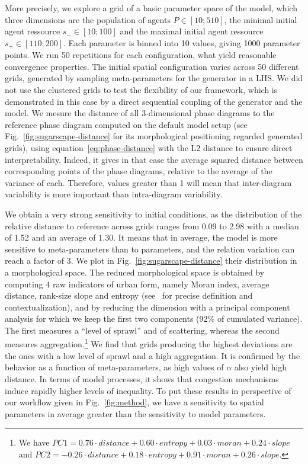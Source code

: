 \documentclass[Afour,sageh,times]{sagej}
\begin{document}
More precisely, we explore a grid of a basic parameter space of the model, which three dimensions are the population of agents $P\in \left[10;510\right]$, the minimal initial agent ressource $s_{-}\in \left[10;100\right]$ and the maximal initial agent ressource $s_{+}\in \left[110;200\right]$. Each parameter is binned into 10 values, giving 1000 parameter points. We run 50 repetitions for each configuration, what yield reasonable convergence properties. The initial spatial configuration varies across 50 different grids, generated by sampling meta-parameters for the generator in a LHS. We did not use the clustered grids to test the flexibility of our framework, which is demonstrated in this case by a direct sequential coupling of the generator and the model. We mesure the distance of all 3-dimensional phase diagrams to the reference phase diagram computed on the default model setup (see Fig.~\ref{fig:sugarscape-distance} for its morphological positioning regarded generated grids), using equation~\ref{eq:phase-distance} with the L2 distance to ensure direct interpretability. Indeed, it gives in that case the average squared distance between corresponding points of the phase diagrams, relative to the average of the variance of each. Therefore, values greater than 1 will mean that inter-diagram variability is more important than intra-diagram variability.


We obtain a very strong sensitivity to initial conditions, as the distribution of the relative distance to reference across grids ranges from 0.09 to 2.98 with a median of 1.52 and an average of 1.30. It means that in average, the model is more sensitive to meta-parameters than to parameters, and the relation variation can reach a factor of 3. We plot in Fig.~\ref{fig:sugarscape-distance} their distribution in a morphological space. The reduced morphological space is obtained by computing 4 raw indicators of urban form, namely Moran index, average distance, rank-size slope and entropy (see~\cite{LeNechet2015} for precise definition and contextualization), and by reducing the dimension with a principal component analysis for which we keep the first two components (92\% of cumulated variance). The first measures a ``level of sprawl'' and of scattering, whereas the second measures aggregation.\footnote{We have $PC1 = 0.76\cdot distance + 0.60\cdot entropy + 0.03\cdot moran + 0.24\cdot slope$ and $PC2 = -0.26\cdot distance + 0.18\cdot entropy + 0.91\cdot moran + 0.26\cdot slope$.} We find that grids producing the highest deviations are the ones with a low level of sprawl and a high aggregation. It is confirmed by the behavior as a function of meta-parameters, as high values of $\alpha$ also yield high distance. In terms of model processes, it shows that congestion mechanisms induce rapidly higher levels of inequality. To put these results in perspective of our workflow given in Fig.~\ref{fig:method}, we have a sensitivity to spatial parameters in average greater than the sensitivity to model parameters.
\end{document}
